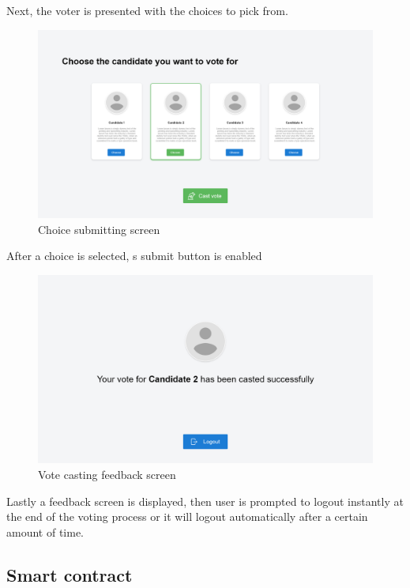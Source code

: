 Next, the voter is presented with the choices to pick from.

\begin{figure}[H]
	\centering
		\includegraphics[width=14cm]{images/chapter3/voter_4.png}
		\caption{{\footnotesize Choice submitting screen}}
\end{figure}

After a choice is selected, s submit button is enabled

\begin{figure}[H]
	\centering
		\includegraphics[width=14cm]{images/chapter3/voter_5.png}
		\caption{{\footnotesize Vote casting feedback screen}}
\end{figure}

Lastly a feedback screen is displayed, then user is prompted to logout instantly at the end of the voting process or it will logout automatically after a certain amount of time.

\subsection{Smart contract}

